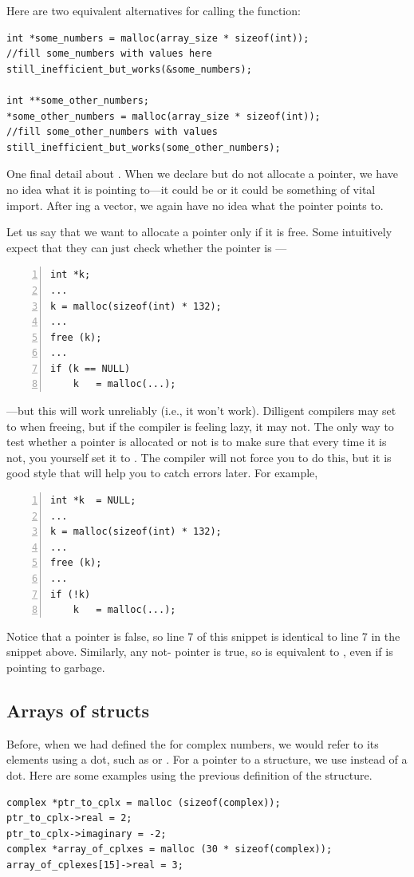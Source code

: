 \documentclass[12pt]{article}
\makeatletter
\def\cind#1{\index{#1@\ci{#1}}\ci{#1}}
\makeatother
\begin{document}
Here are two equivalent alternatives for calling the function:
\begin{lstlisting}
int *some_numbers = malloc(array_size * sizeof(int));
//fill some_numbers with values here
still_inefficient_but_works(&some_numbers);

int **some_other_numbers;
*some_other_numbers = malloc(array_size * sizeof(int));
//fill some_other_numbers with values
still_inefficient_but_works(some_other_numbers);
\end{lstlisting}

One final detail about \cind{free}. When we declare but do not allocate a
pointer, we have no idea what it is pointing to---it could be 
or it could be something of vital import. After ing a vector,
we again have no idea what the pointer points to.

Let us say that we want to allocate a pointer only if it is free. Some
intuitively expect that they can just check whether the pointer is
---
\begin{lstlisting}[numbers=left, numberstyle=\scshape]
int *k;
...
k = malloc(sizeof(int) * 132); 
...
free (k);
...
if (k == NULL)
    k   = malloc(...);
\end{lstlisting}
---but this will work unreliably (i.e., it won't work). Dilligent compilers
may set  to  when freeing, but if the compiler is feeling
lazy, it may not. The only way
to test whether a pointer is allocated or not is to make sure that every
time it is not, you yourself set it to . The compiler will not
force you to do this, but it is good style that will help you to catch
errors later. For example,
\begin{lstlisting}[numbers=left, numberstyle=\scshape]
int *k  = NULL;
...
k = malloc(sizeof(int) * 132); 
...
free (k);
...
if (!k)
    k   = malloc(...);
\end{lstlisting}
Notice that a  pointer is false, so line 7 of this snippet is
identical to line 7 in the snippet above.
Similarly, any not- pointer is true,
so  is equivalent to , even if  is pointing
to garbage.


\subsection{Arrays of structs}	
Before, when we had defined the \cind{struct} for complex numbers, we would refer to its elements using a
dot, such as  or . For a pointer to a structure, we use \cind{$->$} instead of 
a dot.  Here are some examples using the previous definition of the  structure.
\begin{lstlisting}
complex *ptr_to_cplx = malloc (sizeof(complex));
ptr_to_cplx->real = 2;
ptr_to_cplx->imaginary = -2;
complex *array_of_cplxes = malloc (30 * sizeof(complex));
array_of_cplexes[15]->real = 3;
\end{lstlisting}
\end{document}
